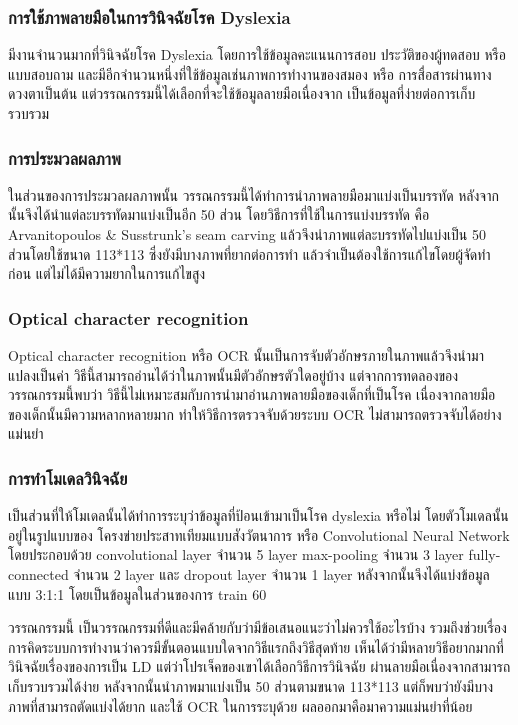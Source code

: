 \documentclass[12pt,oneside,openright,a4paper]{cpe-thai-project}
\begin{document}
\subsubsection{การใช้ภาพลายมือในการวินิจฉัยโรค Dyslexia}
มีงานจำนวนมากที่วินิจฉัยโรค Dyslexia โดยการใช้ข้อมูลคะแนนการสอบ ประวัติของผู้ทดสอบ หรือ แบบสอบถาม และมีอีกจำนวนหนึ่งที่ใช้ข้อมูลเช่นภาพการทำงานของสมอง หรือ การสื่อสารผ่านทางดวงตาเป็นต้น 
แต่วรรณกรรมนี้ได้เลือกที่จะใช้ข้อมูลลายมือเนื่องจาก เป็นข้อมูลที่ง่ายต่อการเก็บรวบรวม


\subsubsection{การประมวลผลภาพ}
ในส่วนของการประมวลผลภาพนั้น วรรณกรรมนี้ได้ทำการนำภาพลายมือมาแบ่งเป็นบรรทัด 
หลังจากนั้นจึงได้นำแต่ละบรรทัดมาแบ่งเป็นอีก 50 ส่วน โดยวิธีการที่ใช้ในการแบ่งบรรทัด คือ 
 Arvanitopoulos & Susstrunk’s seam carving แล้วจึงนำภาพแต่ละบรรทัดไปแบ่งเป็น 50 
 ส่วนโดยใช้ขนาด 113*113 ซึ่งยังมีบางภาพที่ยากต่อการทำ แล้วจำเป็นต้องใช้การแก้ไขโดยผู้จัดทำก่อน แต่ไม่ได้มีความยากในการแก้ไขสูง

 \subsubsection{Optical character recognition}
 Optical character recognition หรือ OCR นั้นเป็นการจับตัวอักษรภายในภาพแล้วจึงนำมาแปลงเป็นค่า
  วิธีนี้สามารถอ่านได้ว่าในภาพนั้นมีตัวอักษรตัวใดอยู่บ้าง แต่จากการทดลองของวรรณกรรมนี้พบว่า 
  วิธีนี้ไม่เหมาะสมกับการนำมาอ่านภาพลายมือของเด็กที่เป็นโรค 
  เนื่องจากลายมือของเด็กนั้นมีความหลากหลายมาก ทำให้วิธีการตรวจจับด้วยระบบ OCR ไม่สามารถตรวจจับได้อย่างแม่นยำ
\subsubsection{การทำโมเดลวินิจฉัย}
เป็นส่วนที่ให้โมเดลนั้นได้ทำการระบุว่าข้อมูลที่ป้อนเข้ามาเป็นโรค dyslexia หรือไม่ 
โดยตัวโมเดลนั้นอยู่ในรูปแบบของ  โครงข่ายประสาทเทียมแบบสังวัตนาการ 
หรือ Convolutional Neural Network โดยประกอบด้วย convolutional layer จำนวน 5 layer 
max-pooling จำนวน 3 layer fully-connected จำนวน 2 layer และ dropout layer จำนวน 1 layer 
หลังจากนั้นจึงได้แบ่งข้อมูลแบบ 3:1:1 โดยเป็นข้อมูลในส่วนของการ train 60%

วรรณกรรมนี้ เป็นวรรณกรรมที่ดีและมีคล้ายกับว่ามีข้อเสนอแนะว่าไม่ควรใช้อะไรบ้าง 
รวมถึงช่วยเรื่องการคิดระบบการทำงานว่าควรมีขั้นตอนแบบใดจากวิธีแรกถึงวิธีสุดท้าย
 เห็นได้ว่ามีหลายวิธีอยากมากที่วินิจฉัยเรื่องของการเป็น LD แต่ว่าโปรเจ็คของเขาได้เลือกวิธีการวินิจฉัย
 ผ่านลายมือเนื่องจากสามารถเก็บรวบรวมได้ง่าย หลังจากนั้นนำภาพมาแบ่งเป็น 50 ส่วนตามขนาด 113*113 
 แต่ก็พบว่ายังมีบางภาพที่สามารถตัดแบ่งได้ยาก และใช้ OCR ในการระบุด้วย ผลออกมาคือมาความแม่นยำที่น้อย
\end{document}
